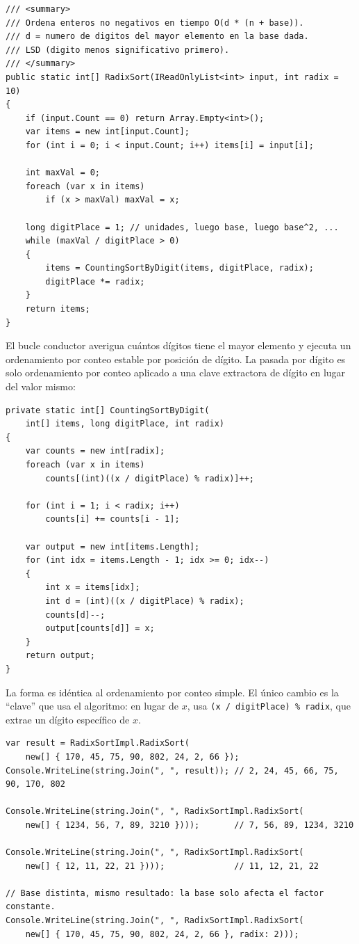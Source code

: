 \documentclass[11pt,a4paper]{article}
\begin{document}
\begin{lstlisting}[caption={Ordenamiento por base (LSD)}]
/// <summary>
/// Ordena enteros no negativos en tiempo O(d * (n + base)).
/// d = numero de digitos del mayor elemento en la base dada.
/// LSD (digito menos significativo primero).
/// </summary>
public static int[] RadixSort(IReadOnlyList<int> input, int radix = 10)
{
    if (input.Count == 0) return Array.Empty<int>();
    var items = new int[input.Count];
    for (int i = 0; i < input.Count; i++) items[i] = input[i];

    int maxVal = 0;
    foreach (var x in items)
        if (x > maxVal) maxVal = x;

    long digitPlace = 1; // unidades, luego base, luego base^2, ...
    while (maxVal / digitPlace > 0)
    {
        items = CountingSortByDigit(items, digitPlace, radix);
        digitPlace *= radix;
    }
    return items;
}
\end{lstlisting}

El bucle conductor averigua cuántos dígitos tiene el mayor elemento y ejecuta un ordenamiento por conteo estable por posición de dígito. La pasada por dígito es solo ordenamiento por conteo aplicado a una clave extractora de dígito en lugar del valor mismo:

\begin{lstlisting}[caption={Una pasada estable: ordenar por \texttt{(x / digitPlace) \% radix}}]
private static int[] CountingSortByDigit(
    int[] items, long digitPlace, int radix)
{
    var counts = new int[radix];
    foreach (var x in items)
        counts[(int)((x / digitPlace) % radix)]++;

    for (int i = 1; i < radix; i++)
        counts[i] += counts[i - 1];

    var output = new int[items.Length];
    for (int idx = items.Length - 1; idx >= 0; idx--)
    {
        int x = items[idx];
        int d = (int)((x / digitPlace) % radix);
        counts[d]--;
        output[counts[d]] = x;
    }
    return output;
}
\end{lstlisting}

La forma es idéntica al ordenamiento por conteo simple. El único cambio es la ``clave'' que usa el algoritmo: en lugar de $x$, usa \texttt{(x / digitPlace) \% radix}, que extrae un dígito específico de $x$.

\begin{lstlisting}
var result = RadixSortImpl.RadixSort(
    new[] { 170, 45, 75, 90, 802, 24, 2, 66 });
Console.WriteLine(string.Join(", ", result)); // 2, 24, 45, 66, 75, 90, 170, 802

Console.WriteLine(string.Join(", ", RadixSortImpl.RadixSort(
    new[] { 1234, 56, 7, 89, 3210 })));       // 7, 56, 89, 1234, 3210

Console.WriteLine(string.Join(", ", RadixSortImpl.RadixSort(
    new[] { 12, 11, 22, 21 })));              // 11, 12, 21, 22

// Base distinta, mismo resultado: la base solo afecta el factor constante.
Console.WriteLine(string.Join(", ", RadixSortImpl.RadixSort(
    new[] { 170, 45, 75, 90, 802, 24, 2, 66 }, radix: 2)));
\end{lstlisting}
\end{document}

